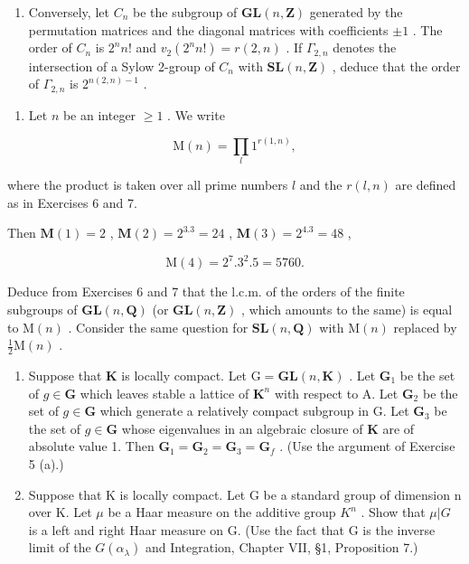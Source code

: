 \begin{enumerate}
\def\labelenumi{(\alph{enumi})}
\setcounter{enumi}{3}
\tightlist
\item
  Conversely, let \(C_{n}\) be the subgroup of \(\mathbf{GL}(n,\mathbf{Z})\) generated by the permutation matrices and the diagonal matrices with coefficients \(\pm1\) . The order of \(C_{n}\) is \(2^{n}n!\) and \(v_{2}(2^{n}n!) = r(2,n)\) . If \(\Gamma_{2,n}\) denotes the intersection of a Sylow 2-group of \(C_{n}\) with \(\mathbf{SL}(n,\mathbf{Z})\) , deduce that the order of \(\Gamma_{2,n}\) is \(2^{n(2,n)-1}\) .
\end{enumerate}

\begin{enumerate}
\def\labelenumi{\arabic{enumi}.}
\setcounter{enumi}{7}
\tightlist
\item
  Let \(n\) be an integer \(\geqslant 1\) . We write
\end{enumerate}

\[
\mathrm{M} (n) = \prod_ {l} 1 ^ {r (1, n)},
\]

where the product is taken over all prime numbers \(l\) and the \(r(l, n)\) are defined as in Exercises 6 and 7.

Then \(\mathbf{M}(1) = 2\) , \(\mathbf{M}(2) = 2^3.3 = 24\) , \(\mathbf{M}(3) = 2^4.3 = 48\) ,

\[
\mathrm{M} (4) = 2 ^ {7}. 3 ^ {2}. 5 = 5 7 6 0.
\]

Deduce from Exercises 6 and 7 that the l.c.m. of the orders of the finite subgroups of \(\mathbf{GL}(n,\mathbf{Q})\) (or \(\mathbf{GL}(n,\mathbf{Z})\) , which amounts to the same) is equal to \(\mathrm{M}(n)\) . Consider the same question for \(\mathbf{SL}(n,\mathbf{Q})\) with \(\mathrm{M}(n)\) replaced by \(\frac{1}{2}\mathrm{M}(n)\) .

\begin{enumerate}
\def\labelenumi{\arabic{enumi}.}
\setcounter{enumi}{8}
\item
  Suppose that \(\mathbf{K}\) is locally compact. Let \(\mathrm{G} = \mathbf{GL}(n,\mathbf{K})\) . Let \(\mathbf{G}_1\) be the set of \(g\in \mathbf{G}\) which leaves stable a lattice of \(\mathbf{K}^n\) with respect to A. Let \(\mathbf{G}_2\) be the set of \(g\in \mathbf{G}\) which generate a relatively compact subgroup in G. Let \(\mathbf{G}_3\) be the set of \(g\in \mathbf{G}\) whose eigenvalues in an algebraic closure of \(\mathbf{K}\) are of absolute value 1. Then \(\mathbf{G}_1 = \mathbf{G}_2 = \mathbf{G}_3 = \mathbf{G}_f\) . (Use the argument of Exercise 5 (a).)
\item
  Suppose that K is locally compact. Let G be a standard group of dimension n over K. Let \(\mu\) be a Haar measure on the additive group \(K^{n}\) . Show that \(\mu|G\) is a left and right Haar measure on G. (Use the fact that G is the inverse limit of the \(G(\alpha_{\lambda})\) and Integration, Chapter VII, §1, Proposition 7.)
\end{enumerate}

